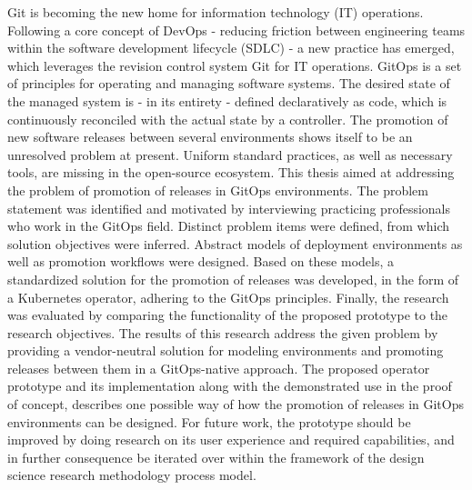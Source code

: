 Git is becoming the new home for information technology (IT) operations.
Following a core concept of DevOps
- reducing friction between engineering teams within the software development lifecycle (SDLC) -
a new practice has emerged,
which leverages the revision control system Git for IT operations.
GitOps is a set of principles for operating and managing software systems.
The desired state of the managed system is
- in its entirety -
defined declaratively as code,
which is continuously reconciled with the actual state by a controller.
The promotion of new software releases between several environments
shows itself to be an unresolved problem at present.
Uniform standard practices, as well as necessary tools, are missing in the open-source ecosystem.
This thesis aimed at addressing the problem of
promotion of releases in GitOps environments.
The problem statement was identified and motivated by
interviewing practicing professionals who work in the GitOps field.
Distinct problem items were defined, from which solution objectives were inferred.
Abstract models of deployment environments as well as promotion workflows
were designed.
Based on these models,
a standardized solution for the promotion of releases
was developed,
in the form of a Kubernetes operator,
adhering to the GitOps principles.
Finally, the research was evaluated by
comparing the functionality of the proposed prototype
to the research objectives.
The results of this research
address the given problem
by providing a vendor-neutral solution
for modeling environments and promoting releases between them
in a GitOps-native approach.
The proposed operator prototype and its implementation along with
the demonstrated use in the proof of concept,
describes one possible way of how the promotion of releases
in GitOps environments can be designed.
For future work, the prototype should be improved
by doing research on its user experience and required capabilities,
and in further consequence be iterated over within the framework of
the design science research methodology process model.























